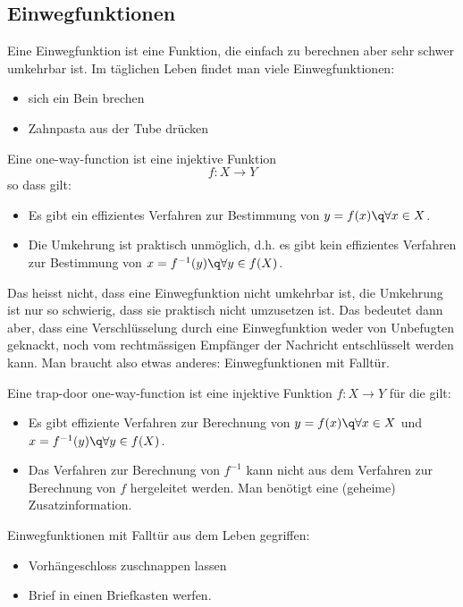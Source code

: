 \documentclass[%
<<<<<<< Updated upstream
11pt,%
twoside,%
titlepage,%
german,%
headsepline%
]{scrartcl}
\begin{document}
\begin{cdef}[Linksverschiebung]{}
\begin{cdef}{}
\subsection{Einwegfunktionen}
Eine Einwegfunktion ist eine Funktion, die einfach zu berechnen aber sehr schwer umkehrbar ist. Im täglichen Leben findet man viele \glqq Einwegfunktionen\grqq:
\begin{itemize}
\item sich ein Bein brechen
\item Zahnpasta aus der Tube drücken
\end{itemize}

\begin{cdef}{}
Eine one-way-function ist eine injektive Funktion
$$f:X\to Y$$
so dass gilt:
\begin{itemize}
\item Es gibt ein effizientes Verfahren zur Bestimmung von $y=f(x)\q\forall x\in X$.
\item Die Umkehrung ist praktisch unmöglich, d.h. es gibt kein effizientes Verfahren zur Bestimmung von $x=f^{-1}(y)\q\forall y\in f(X)$.
\end{itemize}
\end{cdef}

\begin{bem}
Das heisst nicht, dass eine Einwegfunktion nicht umkehrbar ist, die Umkehrung ist nur so schwierig, dass sie praktisch nicht umzusetzen ist.
Das bedeutet dann aber, dass eine Verschlüsselung durch eine Einwegfunktion weder von Unbefugten geknackt, noch vom rechtmässigen Empfänger der Nachricht entschlüsselt werden kann.
Man braucht also etwas anderes: Einwegfunktionen mit Falltür.
\end{bem}

\begin{cdef}{}
Eine trap-door one-way-function ist eine injektive Funktion $f:X\to Y$ für die gilt:
\begin{itemize}
\item Es gibt effiziente Verfahren zur Berechnung von $y=f(x)\q\forall x\in X$ und $x=f^{-1}(y)\q\forall y\in f(X)$.
\item Das Verfahren zur Berechnung von $f^{-1}$ kann nicht aus dem Verfahren zur Berechnung von $f$ hergeleitet werden. Man benötigt eine (geheime) Zusatzinformation.
\end{itemize}
\end{cdef}

\begin{bsps}
Einwegfunktionen mit Falltür aus dem Leben gegriffen:
\begin{itemize}
\item Vorhängeschloss zuschnappen lassen
\item Brief in einen Briefkasten werfen.
\end{itemize}
\end{bsps}


\end{cdef}
\end{cdef}
\end{document}
